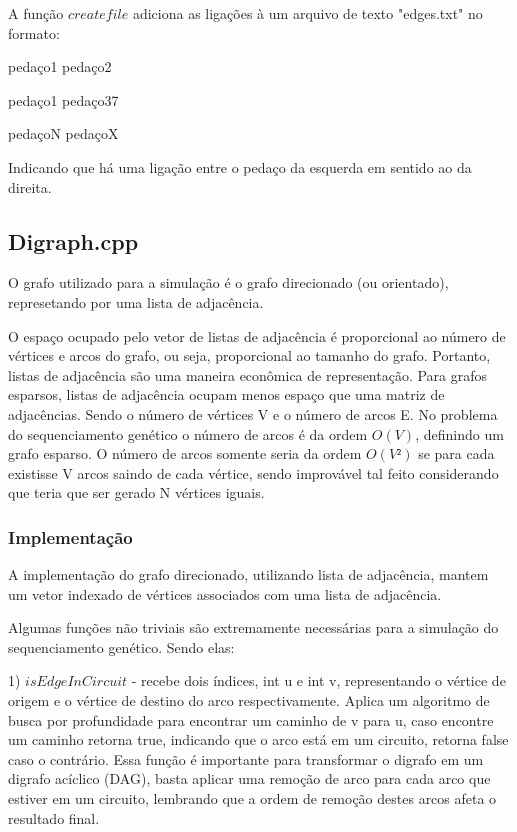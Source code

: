 \documentclass{article}
\begin{document}
\begin{multicols}{2}
A função $createfile$ adiciona as ligações à um arquivo de texto "edges.txt" no formato:

pedaço1 pedaço2

pedaço1 pedaço37

pedaçoN pedaçoX

Indicando que há uma ligação entre o pedaço da esquerda em sentido ao da direita.


\subsection{Digraph.cpp}
O grafo utilizado para a simulação é o grafo direcionado (ou orientado), represetando por uma lista de adjacência.

O espaço ocupado pelo vetor de listas de adjacência é proporcional ao número de vértices e arcos do grafo, ou seja, proporcional ao tamanho do grafo. Portanto, listas de adjacência são uma maneira econômica de representação. Para grafos esparsos, listas de adjacência ocupam menos espaço que uma matriz de adjacências. Sendo o número de vértices V e o número de arcos E. No problema do sequenciamento genético o número de arcos é da ordem $O(V)$, definindo um grafo esparso. O número de arcos somente seria da ordem $O(V²)$ se para cada existisse V arcos saindo de cada vértice, sendo improvável tal feito considerando que teria que ser gerado N vértices iguais.\cite{feofiloff_graphdatastructs}

\subsubsection{Implementação}
A implementação do grafo direcionado, utilizando lista de adjacência, mantem um vetor indexado de vértices associados com uma lista de adjacência.

Algumas funções não triviais são extremamente necessárias para a simulação do sequenciamento genético. Sendo elas:

1) $isEdgeInCircuit$ - recebe dois índices, int u e int v, representando o vértice de origem e o vértice de destino do arco respectivamente. Aplica um algoritmo de busca por profundidade para encontrar um caminho de v para u, caso encontre um caminho retorna true, indicando que o arco está em um circuito, retorna false caso o contrário. Essa função é importante para transformar o digrafo em um digrafo acíclico (DAG), basta aplicar uma remoção de arco para cada arco que estiver em um circuito, lembrando que a ordem de remoção destes arcos afeta o resultado final.


\end{multicols}
\end{document}
